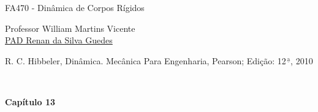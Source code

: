 \documentclass[a4paper,12pt]{article}
\begin{document}
	\begin{center}
		\begin{huge}
			FA470 - Dinâmica de Corpos Rígidos\\\vspace{1cm}
		\end{huge}
		\begin{large}
			Professor William Martins Vicente\\\vspace{.5cm}
			\href{https://github.com/renanGuedes10/}{PAD Renan da Silva Guedes}\\\vspace{1cm}
		\end{large}
		\begin{Large}
			R. C. Hibbeler, Dinâmica. Mecânica Para Engenharia, Pearson; Edição: 12$^{\,\underline{\text{a}}}$, 2010
		\end{Large}\\\vspace{1cm}
		\begin{large}
			\textbf{Capítulo 13}
		\end{large}
	\end{center}    
	
\end{document}
